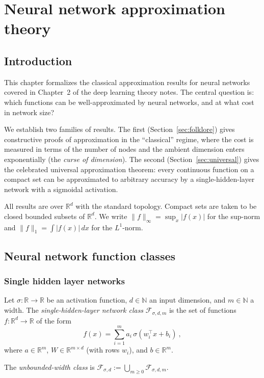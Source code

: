 \chapter{Neural network approximation theory}

\section{Introduction}

This chapter formalizes the classical approximation results for neural networks covered in Chapter~2 of the deep learning theory notes.
The central question is: which functions can be well-approximated by neural networks, and at what cost in network size?

We establish two families of results.
The first (Section~\ref{sec:folklore}) gives constructive proofs of approximation in the ``classical'' regime, where the cost is measured in terms of the number of nodes and the ambient dimension enters exponentially (the \emph{curse of dimension}).
The second (Section~\ref{sec:universal}) gives the celebrated universal approximation theorem: every continuous function on a compact set can be approximated to arbitrary accuracy by a single-hidden-layer network with a sigmoidal activation.

All results are over $\mathbb{R}^d$ with the standard topology.
Compact sets are taken to be closed bounded subsets of $\mathbb{R}^d$.
We write $\|f\|_\infty = \sup_x |f(x)|$ for the sup-norm and $\|f\|_1 = \int |f(x)| \, dx$ for the $L^1$-norm.

\section{Neural network function classes}

\subsection{Single hidden layer networks}

\begin{definition}\label{def:oneHiddenLayerClass}
Let $\sigma : \mathbb{R} \to \mathbb{R}$ be an activation function, $d \in \mathbb{N}$ an input dimension, and $m \in \mathbb{N}$ a width.
The \emph{single-hidden-layer network class} $\mathcal{F}_{\sigma,d,m}$ is the set of functions $f : \mathbb{R}^d \to \mathbb{R}$ of the form
\[
  f(x) = \sum_{i=1}^{m} a_i \, \sigma(w_i^\top x + b_i)
  \: ,
\]
where $a \in \mathbb{R}^m$, $W \in \mathbb{R}^{m \times d}$ (with rows $w_i$), and $b \in \mathbb{R}^m$.

The \emph{unbounded-width class} is $\mathcal{F}_{\sigma,d} := \bigcup_{m \ge 0} \mathcal{F}_{\sigma,d,m}$.
\end{definition}


